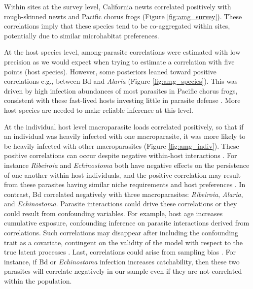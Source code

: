 Within sites at the survey level, California newts correlated positively with rough-skinned newts and Pacific chorus frogs (Figure \ref{fig:amg_survey}).
These correlations imply that these species tend to be co-aggregated within sites, potentially due to similar microhabitat preferences.

At the host species level, among-parasite correlations were estimated with low precision as we would expect when trying to estimate a correlation with five points (host species).
However, some posteriors leaned toward positive correlations e.g., between Bd and \textit{Alaria} (Figure \ref{fig:amg_species}).
This was driven by high infection abundances of most parasites in Pacific chorus frogs, consistent with these fast-lived hosts investing little in parasite defense \citep{Johnson2012}.
More host species are needed to make reliable inference at this level.

At the individual host level macroparasite loads correlated positively, so that if an individual was heavily infected with one macroparasite, it was more likely to be heavily infected with other macroparasites (Figure \ref{fig:amg_indiv}).
These positive correlations can occur despite negative within-host interactions \citep{Johnson2012d}.
For instance \textit{Ribeiroia} and \textit{Echinostoma} both have negative effects on the persistence of one another within host individuals, and the positive correlation may result from these parasites having similar niche requirements and host preferences \citep{Johnson2011c}.
In contrast, Bd correlated negatively with three macroparasites: \textit{Ribeiroia}, \textit{Alaria}, and \textit{Echinostoma}.
Parasite interactions could drive these correlations or they could result from confounding variables.
For example, host age increases cumulative exposure, confounding inference on parasite interactions derived from correlations.
Such correlations may disappear after including the confounding trait as a covariate, contingent on the validity of the model with respect to the true latent processes \citep{Pearl2000Causality}.
Last, correlations could arise from sampling bias \citep{berkson1946}.
For instance, if Bd or \textit{Echinostoma} infection increases catchability, then these two parasites will correlate negatively in our sample even if they are not correlated within the population.

